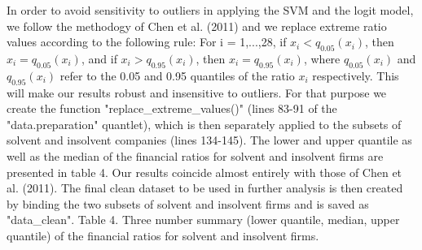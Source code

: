 \documentclass[11pt]{article}
\begin{document}
 In order to avoid sensitivity to outliers in applying the SVM and the logit model, we follow the methodogy of Chen et al. (2011) and we replace extreme ratio values according to the following rule: For i = 1,...,28, if $x_i<q_{0.05}(x_i)$, then $x_i=q_{0.05}(x_i)$, and if $x_i>q_{0.95}(x_i)$, then $x_i=q_{0.95}(x_i)$, where $q_{0.05}(x_i)$ and $q_{0.95}(x_i)$ refer to the 0.05 and 0.95 quantiles of the ratio $x_i$ respectively. This will make our results robust and insensitive to outliers. For that purpose we create the function "replace\_extreme\_values()" (lines 83-91 of the "data.preparation" quantlet), which is then separately applied to the subsets of solvent and insolvent companies (lines 134-145). The lower and upper quantile as well as the median of the financial ratios for solvent and insolvent firms are presented in table 4. Our results coincide almost entirely with those of Chen et al. (2011).  The final clean dataset to be used in further analysis is then created by binding the two subsets of solvent and insolvent firms and is saved as "data\_clean".
 \newpage
 Table 4. Three number summary (lower quantile, median, upper quantile) of the financial ratios for solvent and insolvent firms.
\end{document}

